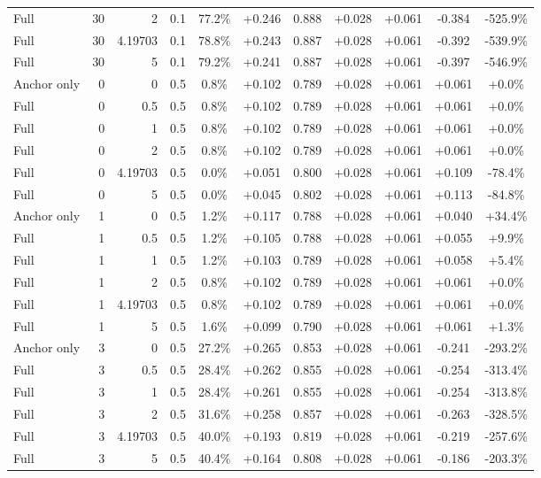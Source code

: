 \begin{table}[htbp]
\begin{tabular}{lrrrccccccc}
Full & 30 & 2 & 0.1 & 77.2\% & +0.246 & 0.888 & +0.028 & +0.061 & -0.384 & -525.9\% \\
Full & 30 & 4.19703 & 0.1 & 78.8\% & +0.243 & 0.887 & +0.028 & +0.061 & -0.392 & -539.9\% \\
Full & 30 & 5 & 0.1 & 79.2\% & +0.241 & 0.887 & +0.028 & +0.061 & -0.397 & -546.9\% \\
Anchor only & 0 & 0 & 0.5 & 0.8\% & +0.102 & 0.789 & +0.028 & +0.061 & +0.061 & +0.0\% \\
Full & 0 & 0.5 & 0.5 & 0.8\% & +0.102 & 0.789 & +0.028 & +0.061 & +0.061 & +0.0\% \\
Full & 0 & 1 & 0.5 & 0.8\% & +0.102 & 0.789 & +0.028 & +0.061 & +0.061 & +0.0\% \\
Full & 0 & 2 & 0.5 & 0.8\% & +0.102 & 0.789 & +0.028 & +0.061 & +0.061 & +0.0\% \\
Full & 0 & 4.19703 & 0.5 & 0.0\% & +0.051 & 0.800 & +0.028 & +0.061 & +0.109 & -78.4\% \\
Full & 0 & 5 & 0.5 & 0.0\% & +0.045 & 0.802 & +0.028 & +0.061 & +0.113 & -84.8\% \\
Anchor only & 1 & 0 & 0.5 & 1.2\% & +0.117 & 0.788 & +0.028 & +0.061 & +0.040 & +34.4\% \\
Full & 1 & 0.5 & 0.5 & 1.2\% & +0.105 & 0.788 & +0.028 & +0.061 & +0.055 & +9.9\% \\
Full & 1 & 1 & 0.5 & 1.2\% & +0.103 & 0.789 & +0.028 & +0.061 & +0.058 & +5.4\% \\
Full & 1 & 2 & 0.5 & 0.8\% & +0.102 & 0.789 & +0.028 & +0.061 & +0.061 & +0.0\% \\
Full & 1 & 4.19703 & 0.5 & 0.8\% & +0.102 & 0.789 & +0.028 & +0.061 & +0.061 & +0.0\% \\
Full & 1 & 5 & 0.5 & 1.6\% & +0.099 & 0.790 & +0.028 & +0.061 & +0.061 & +1.3\% \\
Anchor only & 3 & 0 & 0.5 & 27.2\% & +0.265 & 0.853 & +0.028 & +0.061 & -0.241 & -293.2\% \\
Full & 3 & 0.5 & 0.5 & 28.4\% & +0.262 & 0.855 & +0.028 & +0.061 & -0.254 & -313.4\% \\
Full & 3 & 1 & 0.5 & 28.4\% & +0.261 & 0.855 & +0.028 & +0.061 & -0.254 & -313.8\% \\
Full & 3 & 2 & 0.5 & 31.6\% & +0.258 & 0.857 & +0.028 & +0.061 & -0.263 & -328.5\% \\
Full & 3 & 4.19703 & 0.5 & 40.0\% & +0.193 & 0.819 & +0.028 & +0.061 & -0.219 & -257.6\% \\
Full & 3 & 5 & 0.5 & 40.4\% & +0.164 & 0.808 & +0.028 & +0.061 & -0.186 & -203.3\% \\

\end{tabular}
\end{table}
